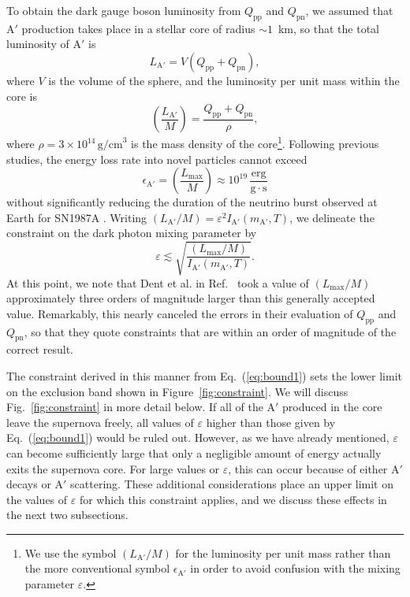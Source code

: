 \documentclass[nofootinbib,prd,superscriptaddress,twocolumn]{revtex4}
\newcommand{\Aprime}{\mathrm{A}'}
\begin{document}
To obtain the dark gauge boson luminosity from $Q_{\mathrm{pp}}$ and $Q_{\mathrm{pn}}$, 
we assumed that $\Aprime$ production takes place in a stellar core of radius $\sim 1$~km, 
so that the total luminosity of $\Aprime$ is 
%
\begin{equation}
L_{\mathrm{A}'} = V (Q_{\mathrm{pp}} + Q_{\mathrm{pn}}),
\end{equation}
%
where $V$ is the volume of the sphere, and the luminosity per unit mass within the core is 
%
\begin{equation}
\left( \frac{L_{\mathrm{A'}}}{M} \right) = \frac{Q_{\mathrm{pp}} + Q_{\mathrm{pn}}}{\rho}, 
\end{equation}
%
where $\rho = 3 \times 10^{14}\, \mathrm{g/cm}^3$ is the mass density of the core\footnote{
We use the symbol $\left( L_{\mathrm{A'}}/M \right)$ for the luminosity per unit mass rather than 
the more conventional symbol $\epsilon_{\mathrm{A'}}$ in order to avoid confusion with the 
mixing parameter $\varepsilon$.}. Following previous studies, the energy loss rate into novel 
particles cannot exceed 
%
\begin{equation}
\epsilon_{\mathrm{A}'} = \left( \frac{L_{\mathrm{max}}}{M} \right) \approx 10^{19} \, \frac{\mathrm{erg}}{\mathrm{g}\cdot \mathrm{s}}
\end{equation}
%
without significantly reducing the duration of the neutrino burst observed at Earth for SN1987A 
\cite{raffelt96_book}. Writing $(L_{\mathrm{A'}}/M) = \varepsilon^2 I_{\mathrm{A'}}(m_{\mathrm{A'}},T)$, 
we delineate the constraint on the dark photon mixing parameter by 
%
\begin{equation}
\label{eq:bound1}
\varepsilon \lesssim \sqrt{\frac{(L_{\mathrm{max}}/M)}{I_{\mathrm{A}'}(m_{\mathrm{A}'}, T)}}.
\end{equation}
%
At this point, we note that Dent et al. in Ref.~\cite{dent_etal12} took a value of 
$(L_{\mathrm{max}}/M)$ approximately three orders of magnitude larger than 
this generally accepted value. Remarkably, this nearly canceled the errors in their evaluation of 
$Q_{\mathrm{pp}}$ and $Q_{\mathrm{pn}}$, so that they quote constraints that are 
within an order of magnitude of the correct result.


The constraint derived in this manner from Eq.~(\ref{eq:bound1}) sets the lower limit on the 
exclusion band shown in Figure~\ref{fig:constraint}. We will discuss Fig.~\ref{fig:constraint} 
in more detail below. If all of the $\Aprime$ produced in the core leave the supernova freely, all 
values of $\varepsilon$ higher than those given by Eq.~(\ref{eq:bound1}) would be ruled out. 
However, as we have already mentioned, $\varepsilon$ can become sufficiently large that only a 
negligible amount of energy actually exits the supernova core. For large values or $\varepsilon$, 
this can occur because of either $\Aprime$ decays or $\Aprime$ scattering. These additional considerations place 
an upper limit on the values of $\varepsilon$ for which this constraint applies, 
and we discuss these effects in the next two subsections.
\end{document}
